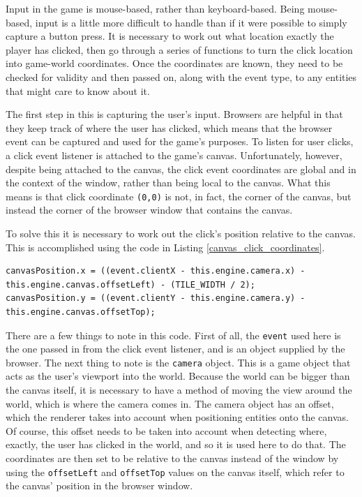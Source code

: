 Input in the game is mouse-based, rather than keyboard-based. Being mouse-based, input is a little more difficult to handle than if it were possible to simply capture a button press. It is necessary to work out what location exactly the player has clicked, then go through a series of functions to turn the click location into game-world coordinates. Once the coordinates are known, they need to be checked for validity and then passed on, along with the event type, to any entities that might care to know about it.

The first step in this is capturing the user's input. Browsers are helpful in that they keep track of where the user has clicked, which means that the browser event can be captured and used for the game's purposes. To listen for user clicks, a click event listener is attached to the game's canvas. Unfortunately, however, despite being attached to the canvas, the click event coordinates are global and in the context of the window, rather than being local to the canvas. What this means is that click coordinate \texttt{(0,0)} is not, in fact, the corner of the canvas, but instead the corner of the browser window that contains the canvas.

To solve this it is necessary to work out the click's position relative to the canvas. This is accomplished using the code in Listing \ref{canvas_click_coordinates}.

\noindent
\begin{minipage}{\linewidth}
\begin{lstlisting}[style=js, caption={Transforming a user's click to be relative to the canvas, rather than the window.}, label=canvas_click_coordinates]
canvasPosition.x = ((event.clientX - this.engine.camera.x) - this.engine.canvas.offsetLeft) - (TILE_WIDTH / 2);
canvasPosition.y = ((event.clientY - this.engine.camera.y) - this.engine.canvas.offsetTop);
\end{lstlisting}
\end{minipage}

There are a few things to note in this code. First of all, the \texttt{event} used here is the one passed in from the click event listener, and is an object supplied by the browser. The next thing to note is the \texttt{camera} object. This is a game object that acts as the user's viewport into the world. Because the world can be bigger than the canvas itself, it is necessary to have a method of moving the view around the world, which is where the camera comes in. The camera object has an offset, which the renderer takes into account when positioning entities onto the canvas. Of course, this offset needs to be taken into account when detecting where, exactly, the user has clicked in the world, and so it is used here to do that. The coordinates are then set to be relative to the canvas instead of the window by using the \texttt{offsetLeft} and \texttt{offsetTop} values on the canvas itself, which refer to the canvas' position in the browser window.

